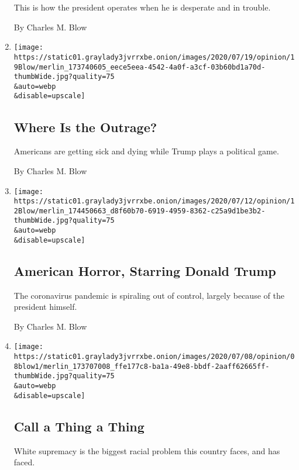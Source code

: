 \begin{enumerate}
  This is how the president operates when he is desperate and in
  trouble.

  By Charles M. Blow
\item
  \href{/2020/07/19/opinion/trump-coronavirus-us.html}{}

  \texttt{[image: https://static01.graylady3jvrrxbe.onion/images/2020/07/19/opinion/19Blow/merlin\_173740605\_eece5eea-4542-4a0f-a3cf-03b60bd1a70d-thumbWide.jpg?quality=75\\\&auto=webp\\\&disable=upscale]}

  \hypertarget{where-is-the-outrage}{%
  \subsection{Where Is the Outrage?}\label{where-is-the-outrage}}

  Americans are getting sick and dying while Trump plays a political
  game.

  By Charles M. Blow
\item
  \href{/2020/07/12/opinion/coronavirus-donald-trump.html}{}

  \texttt{[image: https://static01.graylady3jvrrxbe.onion/images/2020/07/12/opinion/12Blow/merlin\_174450663\_d8f60b70-6919-4959-8362-c25a9d1be3b2-thumbWide.jpg?quality=75\\\&auto=webp\\\&disable=upscale]}

  \hypertarget{american-horror-starring-donald-trump}{%
  \subsection{American Horror, Starring Donald
  Trump}\label{american-horror-starring-donald-trump}}

  The coronavirus pandemic is spiraling out of control, largely because
  of the president himself.

  By Charles M. Blow
\item
  \href{/2020/07/08/opinion/racism-united-states.html}{}

  \texttt{[image: https://static01.graylady3jvrrxbe.onion/images/2020/07/08/opinion/08blow1/merlin\_173707008\_ffe177c8-ba1a-49e8-bbdf-2aaff62665ff-thumbWide.jpg?quality=75\\\&auto=webp\\\&disable=upscale]}

  \hypertarget{call-a-thing-a-thing}{%
  \subsection{Call a Thing a Thing}\label{call-a-thing-a-thing}}

  White supremacy is the biggest racial problem this country faces, and
  has faced.


\end{enumerate}
